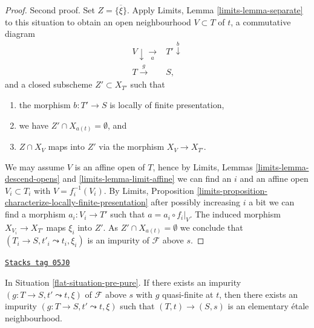 \begin{proof}
\medskip\noindent
Second proof. Set $Z = \overline{\{\xi\}}$. Apply
Limits, Lemma \ref{limits-lemma-separate}
to this situation to obtain an open neighbourhood
$V \subset T$ of $t$, a commutative diagram
$$
\begin{array}{cc}V \downarrow\underset{a}{\longrightarrow} & T' \overset{b}{\downarrow} \\ T \overset{g}{\longrightarrow} & S,\end{array}
$$
and a closed subscheme $Z' \subset X_{T'}$ such that
\begin{enumerate}
\item the morphism $b : T' \to S$ is locally of finite presentation,
\item we have $Z' \cap X_{a(t)} = \emptyset$, and
\item $Z \cap X_V$ maps into $Z'$ via the morphism $X_V \to X_{T'}$.
\end{enumerate}
We may assume $V$ is an affine open of $T$, hence by
Limits, Lemmas \ref{limits-lemma-descend-opens} and
\ref{limits-lemma-limit-affine}
we can find an $i$ and an affine open $V_i \subset T_i$ with
$V = f_i^{-1}(V_i)$. By
Limits,
Proposition \ref{limits-proposition-characterize-locally-finite-presentation}
after possibly increasing $i$ a bit we can find a morphism
$a_i : V_i \to T'$ such that $a = a_i \circ f_i|_V$.
The induced morphism $X_{V_i} \to X_{T'}$ maps $\xi_i$ into
$Z'$. As $Z' \cap X_{a(t)} = \emptyset$ we conclude that
$(T_i \to S, t'_i \leadsto t_i, \xi_i)$ is an impurity of
$\mathcal{F}$ above $s$.
\end{proof}

\begin{lemma}
\label{flat-lemma-quasi-finite-impurity-elementary}
\href{https://stacks.math.columbia.edu/tag/05J0}{\texttt{Stacks tag 05J0}}

In Situation \ref{flat-situation-pre-pure}.
If there exists an impurity $(g : T \to S, t' \leadsto t, \xi)$
of $\mathcal{F}$ above $s$ with $g$ quasi-finite at $t$, then there
exists an impurity $(g : T \to S, t' \leadsto t, \xi)$ such that
$(T, t) \to (S, s)$ is an elementary \'etale neighbourhood.
\end{lemma}

